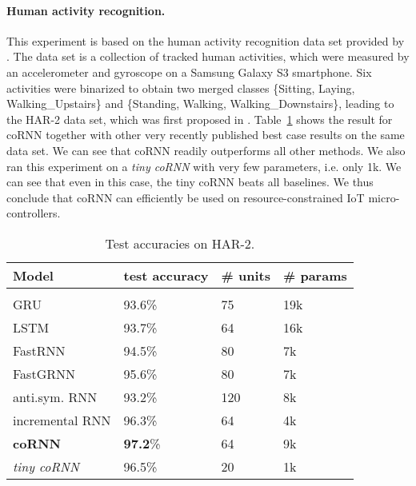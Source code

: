 \documentclass{article} \usepackage{iclr2021_conference,times}
\newcommand{\Tref}[1]{Table~\ref{#1}}
\begin{document}
\paragraph{Human activity recognition.}
This experiment is based on the human activity recognition data set provided by \cite{har}. The data set is a collection of tracked human activities, which were measured by an accelerometer and gyroscope on a Samsung Galaxy S3 smartphone. Six activities were binarized to obtain two merged classes \{Sitting, Laying, Walking\_Upstairs\} and \{Standing, Walking, Walking\_Downstairs\}, leading to the HAR-2 data set, which was first proposed in \cite{fastrnn}. \Tref{tab:har2} shows the result for coRNN together with other very recently published best case results on the same data set. We can see that coRNN readily outperforms all other methods. We also ran this experiment on a \textit{tiny coRNN} with very few parameters, i.e. only 1k. We can see that even in this case, the tiny coRNN beats all baselines. We thus conclude that coRNN can efficiently be used on resource-constrained IoT micro-controllers.
\begin{table}[htbp]
\caption{Test accuracies on HAR-2.}
\label{tab:har2}
\begin{center}
\begin{tabular}{llll}
{ Model} &  test accuracy & \# units & { \# params}
\\ \hline \\
GRU \citep{fastrnn}&  93.6\% & 75 & 19k\\
LSTM \citep{inc_rnn}& 93.7\%  & 64 & 16k \\
FastRNN \citep{fastrnn}& 94.5\%  & 80 & 7k \\
FastGRNN \citep{fastrnn}& 95.6\% & 80 &  7k\\
anti.sym. RNN \citep{inc_rnn}& 93.2\% & 120 & 8k \\
incremental RNN \citep{inc_rnn}& 96.3\% & 64 & 4k \\
\textbf{coRNN} & \textbf{97.2}\% & 64 & 9k\\
\textit{tiny coRNN} & 96.5\% & 20 & 1k \\
\end{tabular}
\end{center}
\end{table}
\end{document}

